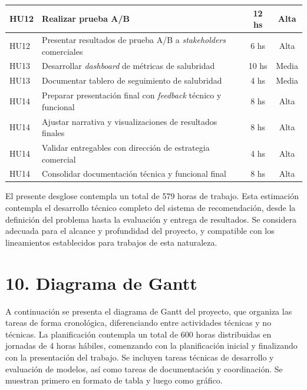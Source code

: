 \documentclass[
11pt, %
]{charter}
\begin{document}
\begin{longtable}{|p{2cm}|p{10cm}|c|c|}
HU12 & Realizar prueba A/B & 12 hs & Alta \\ \hline
HU12 & Presentar resultados de prueba A/B a \textit{stakeholders} comerciales & 6 hs & Alta \\ \hline

HU13 & Desarrollar \textit{dashboard} de métricas de salubridad & 10 hs & Media \\ \hline
HU13 & Documentar tablero de seguimiento de salubridad & 4 hs & Media \\ \hline

HU14 & Preparar presentación final con \textit{feedback} técnico y funcional & 8 hs & Alta \\ \hline
HU14 & Ajustar narrativa y visualizaciones de resultados finales & 8 hs & Alta \\ \hline
HU14 & Validar entregables con dirección de estrategia comercial & 4 hs & Alta \\ \hline
HU14 & Consolidar documentación técnica y funcional final & 8 hs & Alta \\ \hline

\end{longtable}

El presente desglose contempla un total de 579 horas de trabajo. Esta estimación contempla el desarrollo técnico completo del sistema de recomendación, desde la definición del problema hasta la evaluación y entrega de resultados. Se considera adecuada para el alcance y profundidad del proyecto, y compatible con los lineamientos establecidos para trabajos de esta naturaleza.

\section{10. Diagrama de Gantt}
\label{sec:gantt}

A continuación se presenta el diagrama de Gantt del proyecto, que organiza las tareas de forma cronológica, diferenciando entre actividades técnicas y no técnicas. La planificación contempla un total de 600 horas distribuidas en jornadas de 4 horas hábiles, comenzando con la planificación inicial y finalizando con la presentación del trabajo. Se incluyen tareas técnicas de desarrollo y evaluación de modelos, así como tareas de documentación y coordinación. Se muestran primero en formato de tabla y luego como gráfico.
\end{document}
